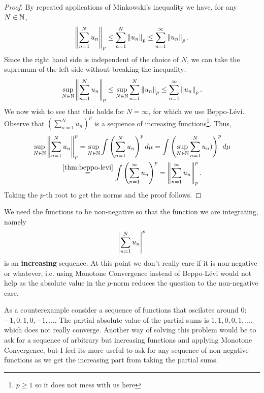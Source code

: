 \begin{proof}
	By repeated applications of Minkowski's inequality we have, for any $N \in \mathbb{N}$,
	\begin{align*}
		\left\Vert{\sum_{n=1}^N u_n}\right\Vert_p
		\leq \sum_{n = 1}^N \left\Vert{u_n}\right\Vert_p
		\leq \sum_{n= 1}^\infty \left\Vert{u_n}\right\Vert_p.
	\end{align*}
	Since the right hand side is independent of the choice of $N$, we can take the supremum of the left side without breaking the inequality:
	\begin{align*}
		\sup_{N\in\mathbb{N}} \left\Vert{\sum_{n=1}^N u_n}\right\Vert_p
		\leq \sup_{N\in\mathbb{N}} \sum_{n = 1}^N \left\Vert{u_n}\right\Vert_p
		\leq \sum_{n= 1}^\infty \left\Vert{u_n}\right\Vert_p.
	\end{align*}
	We now wish to see that this holds for $N = \infty$, for which we use Beppo-Lévi. Observe that $(\sum_{n=1}^N u_n)^p$ is a sequence of increasing functions\footnote{$p \geq 1$ so it does not mess with us here}. Thus,
	\begin{multline*}
		\sup_{N\in\mathbb{N}} \left\Vert{\sum_{n=1}^N u_n}\right\Vert_p^p
		= \sup_{N\in\mathbb{N}} \int \left(\sum_{n=1}^N u_n\right)^p d\mu
		= \int \left(\sup_{N \in \mathbb{N}} \sum_{n=1}^N u_n)\right)^p d\mu\\
		\overset{\ref{thm:beppo-levi}}{=} \int \left( \sum_{n=1}^\infty u_n \right)^p
		= \left\Vert{\sum_{n=1}^\infty u_n}\right\Vert_p^p.
	\end{multline*}
	Taking the $p$-th root to get the norms and the proof follows.
\end{proof}

\begin{remark}
	We need the functions to be non-negative so that the function we are integrating, namely
	\begin{align*}
		\left\vert{\sum_{n=1}^N u_n}\right\vert^p
	\end{align*}
	is an \textbf{increasing} sequence. At this point we don't really care if it is non-negative or whatever, i.e. using Monotone Convergence instead of Beppo-Lévi would not help as the absolute value in the $p$-norm reduces the question to the non-negative case.
	
	As a counterexample consider a sequence of functions that oscilates around 0: $-1, 0, 1, 0, -1, \dots$. The partial absolute value of the partial sums is $1, 1, 0, 0, 1, \dots$, which does not really converge. Another way of solving this problem would be to ask for a sequence of arbitrary but increasing functions and applying Monotone Convergence, but I feel its more useful to ask for any sequence of non-negative functions as we get the increasing part from taking the partial sums.
\end{remark}



